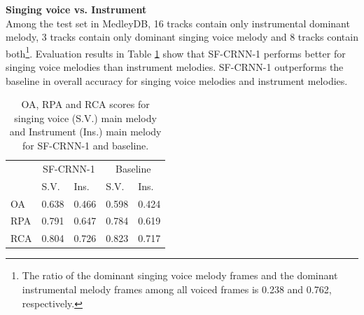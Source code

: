 \documentclass{article}
\newcommand{\jbcor}[2]{{\textcolor{black}{#2}}}
\begin{document}

\vspace{0.15cm}
\hspace{-0.45cm}\textbf{Singing voice vs. Instrument}\\
Among the test set in \jbcor{the}{} MedleyDB, 16 tracks contain only instrumental dominant melody, 3 tracks contain only dominant singing voice melody and 8 tracks contain both\footnote{The ratio of the dominant singing voice melody frames and the dominant instrumental melody frames among all voiced frames is 0.238 and 0.762, respectively.}. Evaluation results in Table \ref{tab:vocal-instrument} show that SF-CRNN-1 performs better for singing voice melodies than instrument melodies. SF-CRNN-1 outperforms the baseline in overall accuracy for singing voice melodies and instrument melodies. 
\begin{table}
  \begin{center}
  \begin{tabular}{|l | l l|l l|}
    \hline
      \multirow{2}{*}{}& \multicolumn{2}{c}{SF-CRNN-1} &
      \multicolumn{2}{|c|}{Baseline} \\
    & S.V. & Ins. & S.V. & Ins.  \\
    \hline
    OA & 0.638 & 0.466 & 0.598 & 0.424  \\
    \hline
    RPA & 0.791 & 0.647 & 0.784 & 0.619  \\
    \hline
    RCA & 0.804 & 0.726 & 0.823 & 0.717  \\
    \hline
  \end{tabular}
  \end{center}	
  \caption{OA, RPA and RCA scores for singing voice (S.V.) main melody and Instrument (Ins.) main melody for SF-CRNN-1 and baseline.}
 \label{tab:vocal-instrument}
\end{table}
\end{document}
